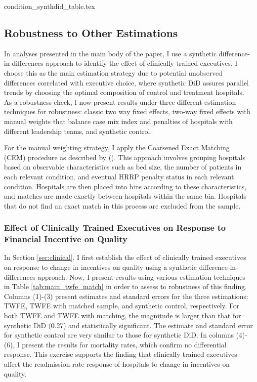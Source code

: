 \documentclass[12pt]{article}
\begin{document}
{condition_synthdid_table.tex}


\subsection{Robustness to Other Estimations}\label{app:otherestimations}

In analyses presented in the main body of the paper, I use a synthetic difference-in-differences approach to identify the effect of clinically trained executives. I choose this as the main estimation strategy due to potential unobserved differences correlated with executive choice, where synthetic DiD assures parallel trends by choosing the optimal composition of control and treatment hospitals. As a robustness check, I now present results under three different estimation techniques for robustness: classic two way fixed effects, two-way fixed effects with manual weights that balance case mix index and penalties of hospitals with different leadership teams, and synthetic control. 

For the manual weighting strategy, I apply the Coarsened Exact Matching (CEM) procedure as described by \citeauthor{azoulay2010superstar} (\citeyear{azoulay2010superstar}). This approach involves grouping hospitals based on observable characteristics such as bed size, the number of patients in each relevant condition, and eventual HRRP penalty status in each relevant condition. Hospitals are then placed into bins according to these characteristics, and matches are made exactly between hospitals within the same bin. Hospitals that do not find an exact match in this process are excluded from the sample.

\subsubsection{Effect of Clinically Trained Executives on Response to Financial Incentive on Quality}

In Section \ref{sec:clinical}, I first establish the effect of clinically trained executives on response to change in incentives on quality using a synthetic difference-in-differences approach. Now, I present results using various estimation techniques in Table \ref{tab:main_twfe_match} in order to assess to robustness of this finding. Columns (1)-(3) present estimates and standard errors for the three estimations: TWFE, TWFE with matched sample, and synthetic control, respectively. For both TWFE and TWFE with matching, the magnitude is larger than that for synthetic DiD (0.27) and statistically significant. The estimate and standard error for synthetic control are very similar to those for synthetic DiD. In columns (4)-(6), I present the results for mortality rates, which confirm no differential response. This exercise supports the finding that clinically trained executives affect the readmission rate response of hospitals to change in incentives on quality. 
\end{document}
